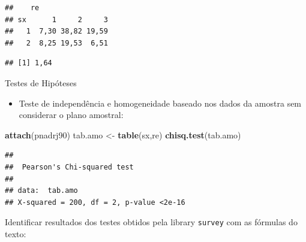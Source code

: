 \documentclass[]{book}
\newenvironment{Shaded}{\begin{snugshade}}{\end{snugshade}}
\newcommand{\KeywordTok}[1]{\textcolor[rgb]{0.13,0.29,0.53}{\textbf{#1}}}
\newcommand{\DataTypeTok}[1]{\textcolor[rgb]{0.13,0.29,0.53}{#1}}
\newcommand{\StringTok}[1]{\textcolor[rgb]{0.31,0.60,0.02}{#1}}
\newcommand{\CommentTok}[1]{\textcolor[rgb]{0.56,0.35,0.01}{\textit{#1}}}
\newcommand{\OperatorTok}[1]{\textcolor[rgb]{0.81,0.36,0.00}{\textbf{#1}}}
\newcommand{\NormalTok}[1]{#1}
\providecommand{\tightlist}{%
  \setlength{\itemsep}{0pt}\setlength{\parskip}{0pt}}
\theoremstyle{definition}
\theoremstyle{definition}
\theoremstyle{definition}
\theoremstyle{remark}
\let\BeginKnitrBlock\begin \let\EndKnitrBlock\end
\begin{document}
\begin{verbatim}
##    re
## sx      1     2     3
##   1  7,30 38,82 19,59
##   2  8,25 19,53  6,51
\end{verbatim}

\begin{Shaded}
\end{Shaded}

\begin{verbatim}
## [1] 1,64
\end{verbatim}

\BeginKnitrBlock{example}
\protect\hypertarget{exm:exe83}{}{\label{exm:exe83} }Testes de Hipóteses
\EndKnitrBlock{example}

\begin{itemize}
\tightlist
\item
  Teste de independência e homogeneidade baseado nos dados da amostra
  sem considerar o plano amostral:
\end{itemize}

\begin{Shaded}
\begin{Highlighting}[]
\KeywordTok{attach}\NormalTok{(pnadrj90)}
\NormalTok{tab.amo <-}\StringTok{ }\KeywordTok{table}\NormalTok{(sx,re)}
\KeywordTok{chisq.test}\NormalTok{(tab.amo)}
\end{Highlighting}
\end{Shaded}

\begin{verbatim}
## 
##  Pearson's Chi-squared test
## 
## data:  tab.amo
## X-squared = 200, df = 2, p-value <2e-16
\end{verbatim}

\BeginKnitrBlock{remark}
{}Identificar resultados dos testes obtidos
pela library \texttt{survey} \citep{R-survey} com as fórmulas do texto:
\EndKnitrBlock{remark}
\end{document}
